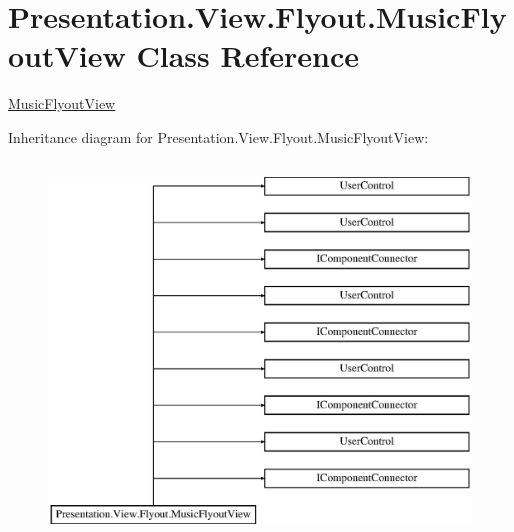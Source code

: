 \hypertarget{class_presentation_1_1_view_1_1_flyout_1_1_music_flyout_view}{}\section{Presentation.\+View.\+Flyout.\+Music\+Flyout\+View Class Reference}
\label{class_presentation_1_1_view_1_1_flyout_1_1_music_flyout_view}


\hyperlink{class_presentation_1_1_view_1_1_flyout_1_1_music_flyout_view}{Music\+Flyout\+View}  


Inheritance diagram for Presentation.\+View.\+Flyout.\+Music\+Flyout\+View\+:\begin{figure}[H]
\begin{center}
\leavevmode
\includegraphics[height=10.000000cm]{class_presentation_1_1_view_1_1_flyout_1_1_music_flyout_view}
\end{center}
\end{figure}
